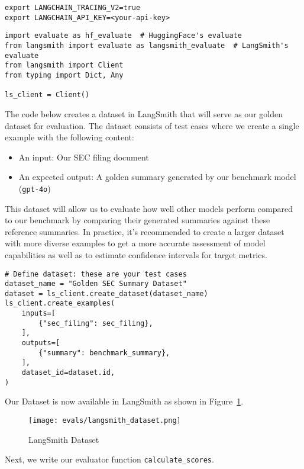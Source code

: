 \begin{verbatim}
export LANGCHAIN_TRACING_V2=true
export LANGCHAIN_API_KEY=<your-api-key>
\end{verbatim}

\begin{verbatim}
import evaluate as hf_evaluate  # HuggingFace's evaluate
from langsmith import evaluate as langsmith_evaluate  # LangSmith's evaluate
from langsmith import Client
from typing import Dict, Any

ls_client = Client()
\end{verbatim}

The code below creates a dataset in LangSmith that will serve as our golden dataset for evaluation. The dataset consists of test cases where we create a single example with the following content:

\begin{itemize}
\item An input: Our SEC filing document
\item An expected output: A golden summary generated by our benchmark model (\texttt{gpt-4o})
\end{itemize}

This dataset will allow us to evaluate how well other models perform compared to our benchmark by comparing their generated summaries against these reference summaries. In practice, it's recommended to create a larger dataset with more diverse examples to get a more accurate assessment of model capabilities as well as to estimate confidence intervals for target metrics.

\begin{verbatim}
# Define dataset: these are your test cases
dataset_name = "Golden SEC Summary Dataset"
dataset = ls_client.create_dataset(dataset_name)
ls_client.create_examples(
    inputs=[
        {"sec_filing": sec_filing},
    ],
    outputs=[
        {"summary": benchmark_summary},
    ],
    dataset_id=dataset.id,
)
\end{verbatim}
Our Dataset is now available in LangSmith as shown in Figure~\ref{fig:langsmith_dataset}.
\begin{figure}[h]
\centering
\texttt{[image: evals/langsmith\_dataset.png]}
\label{fig:langsmith_dataset}
\caption{LangSmith Dataset}
\end{figure}

Next, we write our evaluator function \texttt{calculate\_scores}.~

